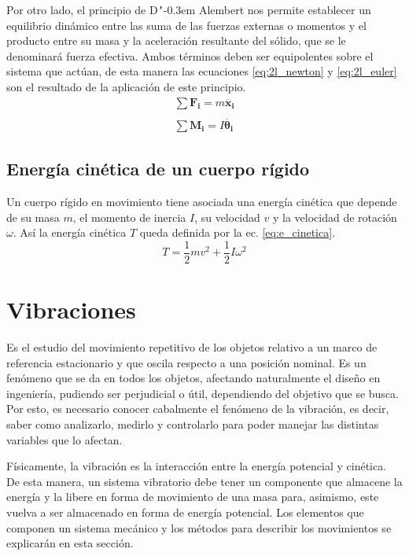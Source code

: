 Por otro lado, el principio de D\texttt{'}\kern-0.3em Alembert nos permite establecer un equilibrio dinámico entre las suma de las fuerzas externas o momentos y el producto entre su masa y la aceleración resultante del sólido, que se le denominará fuerza efectiva. Ambos términos deben ser equipolentes sobre el sistema que actúan, de esta manera las ecuaciones \ref{eq:2l_newton} y \ref{eq:2l_euler} son el resultado de la aplicación de este principio.
\begin{gather}
	\sum \mathbf{F_i} = m\mathbf{\ddot{x_i}} \label{eq:2l_newton}\\
	\nonumber \\
	\sum \mathbf{M_i} = I\mathbf{\ddot{\theta_i}} \label{eq:2l_euler}
\end{gather}

\subsection{Energía cinética de un cuerpo rígido}
Un cuerpo rígido en movimiento tiene asociada una energía cinética que depende de su masa $m$, el momento de inercia $I$, su velocidad $v$ y la velocidad de rotación $\omega$. Así la energía cinética $T$ queda definida por la ec. \ref{eq:e_cinetica}.
\begin{equation}\label{eq:e_cinetica}
	T = \frac{1}{2}mv^2 + \frac{1}{2}I\omega^2 
\end{equation}


\section{Vibraciones}
Es el estudio del movimiento repetitivo de los objetos relativo a un marco de referencia estacionario y que oscila respecto a una posición nominal. Es un fenómeno que se da en todos los objetos, afectando naturalmente el diseño en ingeniería, pudiendo ser perjudicial o útil, dependiendo del objetivo que se busca. Por esto, es necesario conocer cabalmente el fenómeno de la vibración, es decir, saber como analizarlo, medirlo y controlarlo para poder manejar las distintas variables que lo afectan.

Físicamente, la vibración es la interacción entre la energía potencial y cinética. De esta manera, un sistema vibratorio debe tener un componente que almacene la energía y la libere en forma de movimiento de una masa para, asimismo, este vuelva a ser almacenado en forma de energía potencial. Los elementos que componen un sistema mecánico y los métodos para describir los movimientos se explicarán en esta sección.


